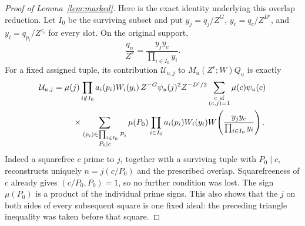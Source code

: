 \documentclass[12pt]{article}
\begin{document}
\begin{proof}[Proof of Lemma~\ref{lem:marked}]
Here is the exact identity underlying this overlap reduction.  Let
\(I_0\) be the surviving subset and put
\(y_j=q_j/Z^G\), \(y_c=q_c/Z^{D'}\), and
\(y_i=q_{p_i}/Z^{z_i}\) for every slot.  On the original support,
\[
 \frac{q_n}{Z^r}=\frac{y_jy_c}{\prod_{i\in I_0}y_i}.
\]
For a fixed assigned tuple, its contribution \(\mathcal U_{u,j}\) to
\(M_u(Z^r;W)Q_u\) is exactly
\begin{equation}\label{eq:initial-overlap-polynomial}
 \begin{split}
 \mathcal U_{u,j}={}&\mu(j)
 \prod_{i\notin I_0}a_i(p_i)W_i(y_i)\,
 Z^{-G}\psi_u(j)^2 Z^{-D'/2}
 \sum_{\substack{c\ {\rm sf}\\(c,j)=1}}\mu(c)\psi_u(c)\\
 &\quad\times
 \sum_{\substack{(p_i)\in\prod_{i\in I_0}\mathcal P_i\\P_0\mid c}}
 \mu(P_0)\prod_{i\in I_0}a_i(p_i)W_i(y_i)
 W\!\left(\frac{y_jy_c}{\prod_{i\in I_0}y_i}\right).
 \end{split}
\end{equation}
Indeed a squarefree \(c\) prime to \(j\), together with a surviving
tuple with \(P_0\mid c\), reconstructs uniquely
\(n=j(c/P_0)\) and the prescribed overlap.  Squarefreeness of \(c\)
already gives \((c/P_0,P_0)=1\), so no further condition was lost.
The sign \(\mu(P_0)\) is a product of the individual prime signs.
This also shows that the \(j\) on both sides of every subsequent
square is one fixed ideal: the preceding triangle inequality was
taken before that square.


\end{proof}
\end{document}
